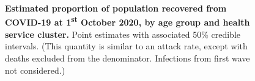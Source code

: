 \begin{figure}[ht]
    \caption{\textbf{Estimated proportion of population recovered from COVID-19 at 1\textsuperscript{st} October 2020, by age group and health service cluster.} Point estimates with associated 50\% credible intervals. (This quantity is similar to an attack rate, except with deaths excluded from the denominator. Infections from first wave not considered.)}
\end{figure}
